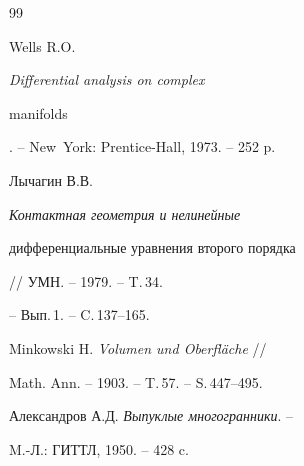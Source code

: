 \begin{thebibliography}{99}


Wells R.O. {\it Differential analysis on complex


manifolds}. -- New~York: Prentice-Hall, 1973. -- 252 p.




Лычагин В.В. {\it Контактная геометрия и нелинейные


дифференциальные уравнения второго порядка} // УМН. -- 1979. -- T.\,34.


-- Вып.\,1. -- C.\,137--165.




Minkowski H. {\it Volumen und Oberfl\"ache} //


Math. Ann. -- 1903. -- T.\,57. -- S.\,447--495.




Александров А.Д. {\it Выпуклые многогранники}. --


M.-Л.: ГИТТЛ, 1950. -- 428 c.


\end{thebibliography}





\vskip 2cm














\label{end}





